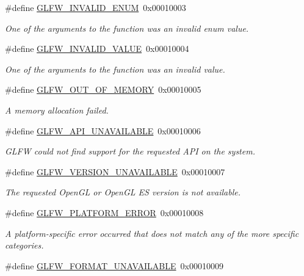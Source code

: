 \begin{DoxyCompactItemize}
\#define \hyperlink{group__errors_ga76f6bb9c4eea73db675f096b404593ce}{G\+L\+F\+W\+\_\+\+I\+N\+V\+A\+L\+I\+D\+\_\+\+E\+N\+UM}~0x00010003
\begin{DoxyCompactList}\small\item\em One of the arguments to the function was an invalid enum value. \end{DoxyCompactList}\item 
\#define \hyperlink{group__errors_gaaf2ef9aa8202c2b82ac2d921e554c687}{G\+L\+F\+W\+\_\+\+I\+N\+V\+A\+L\+I\+D\+\_\+\+V\+A\+L\+UE}~0x00010004
\begin{DoxyCompactList}\small\item\em One of the arguments to the function was an invalid value. \end{DoxyCompactList}\item 
\#define \hyperlink{group__errors_ga9023953a2bcb98c2906afd071d21ee7f}{G\+L\+F\+W\+\_\+\+O\+U\+T\+\_\+\+O\+F\+\_\+\+M\+E\+M\+O\+RY}~0x00010005
\begin{DoxyCompactList}\small\item\em A memory allocation failed. \end{DoxyCompactList}\item 
\#define \hyperlink{group__errors_ga56882b290db23261cc6c053c40c2d08e}{G\+L\+F\+W\+\_\+\+A\+P\+I\+\_\+\+U\+N\+A\+V\+A\+I\+L\+A\+B\+LE}~0x00010006
\begin{DoxyCompactList}\small\item\em G\+L\+FW could not find support for the requested A\+PI on the system. \end{DoxyCompactList}\item 
\#define \hyperlink{group__errors_gad16c5565b4a69f9c2a9ac2c0dbc89462}{G\+L\+F\+W\+\_\+\+V\+E\+R\+S\+I\+O\+N\+\_\+\+U\+N\+A\+V\+A\+I\+L\+A\+B\+LE}~0x00010007
\begin{DoxyCompactList}\small\item\em The requested Open\+GL or Open\+GL ES version is not available. \end{DoxyCompactList}\item 
\#define \hyperlink{group__errors_gad44162d78100ea5e87cdd38426b8c7a1}{G\+L\+F\+W\+\_\+\+P\+L\+A\+T\+F\+O\+R\+M\+\_\+\+E\+R\+R\+OR}~0x00010008
\begin{DoxyCompactList}\small\item\em A platform-\/specific error occurred that does not match any of the more specific categories. \end{DoxyCompactList}\item 
\#define \hyperlink{group__errors_ga196e125ef261d94184e2b55c05762f14}{G\+L\+F\+W\+\_\+\+F\+O\+R\+M\+A\+T\+\_\+\+U\+N\+A\+V\+A\+I\+L\+A\+B\+LE}~0x00010009

\end{DoxyCompactItemize}
